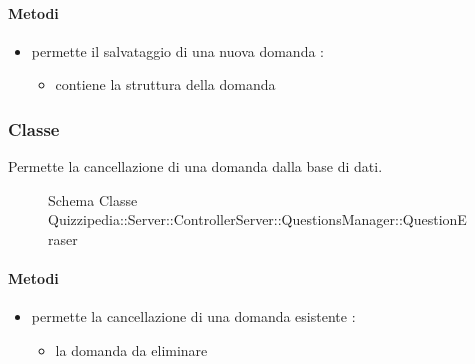 \paragraph{Metodi}
\begin{itemize}
\item {}
\newline
permette il salvataggio di una nuova domanda
\newline
{} :
\begin{itemize}
\item {}
\newline
contiene la struttura della domanda
\end{itemize}
\end{itemize}
\subsubsection{Classe }
Permette la cancellazione di una domanda dalla base di dati.
\begin{figure}[H]
\centering
\noindent{}
\caption[Schema Classe QuestionEraser]{Schema Classe Quizzipedia::Server::ControllerServer::QuestionsManager::QuestionEraser}
\end{figure}
\paragraph{Metodi}
\begin{itemize}
\item {}
\newline
permette la cancellazione di una domanda esistente
\newline
{} :
\begin{itemize}
\item {}
\newline
la domanda da eliminare
\end{itemize}
\end{itemize}
